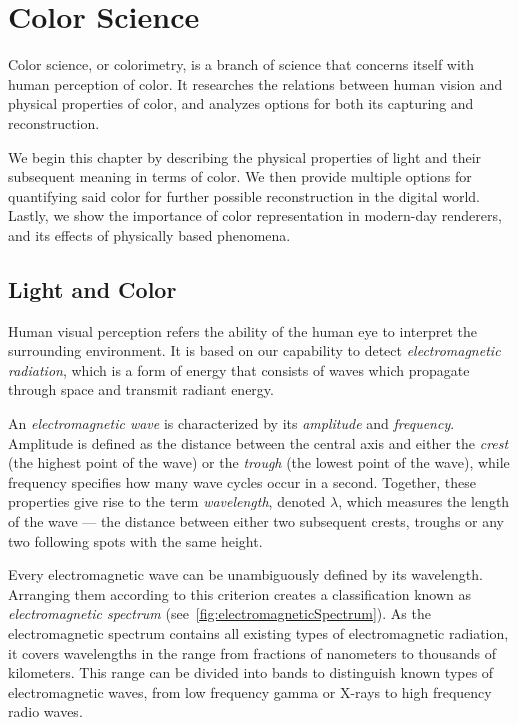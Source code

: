 \chapter{Color Science}

Color science, or colorimetry, is a branch of science that concerns itself with human perception of color. It researches the relations between human vision and physical properties of color, and analyzes options for both its capturing and reconstruction.

We begin this chapter by describing the physical properties of light and their subsequent meaning in terms of color. We then provide multiple options for quantifying said color for further possible reconstruction in the digital world. Lastly, we show the importance of color representation in modern-day renderers, and its effects of physically based phenomena.

\section{Light and Color}

Human visual perception refers the ability of the human eye to interpret the surrounding environment. It is based on our capability to detect \emph{electromagnetic radiation}, which is a form of energy that consists of waves which propagate through space and transmit radiant energy.

An \emph{electromagnetic wave} is characterized by its \emph{amplitude} and \emph{frequency}. Amplitude is defined as the distance between the central axis and either the \emph{crest} (the highest point of the wave) or the \emph{trough} (the lowest point of the wave), while frequency specifies how many wave cycles occur in a second. Together, these properties give rise to the term \emph{wavelength}, denoted $\lambda$, which measures the length of the wave --- the distance between either two subsequent crests, troughs or any two following spots with the same height. 

Every electromagnetic wave can be unambiguously defined by its wavelength. Arranging them according to this criterion creates a classification known as \emph{electromagnetic spectrum} (see~\cref{fig:electromagneticSpectrum}). As the electromagnetic spectrum contains all existing types of electromagnetic radiation, it covers wavelengths in the range from fractions of nanometers to thousands of kilometers. This range can be divided into bands to distinguish known types of electromagnetic waves, from low frequency gamma or X-rays to high frequency radio waves. 


